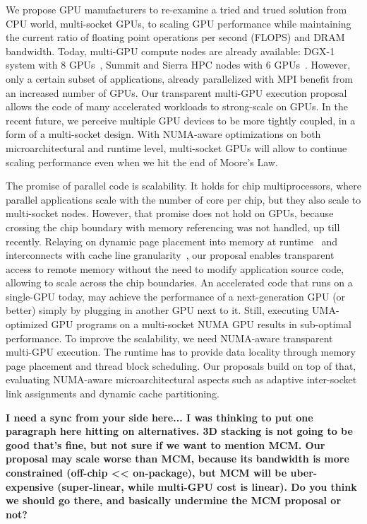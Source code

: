 \documentclass{sig-alternate}
\begin{document}
We propose GPU manufacturers to re-examine a tried and trued solution from CPU world, multi-socket GPUs, to scaling GPU performance while maintaining the current ratio of floating point operations per second (FLOPS) and DRAM bandwidth. Today, multi-GPU compute nodes are already available: DGX-1 system with 8 GPUs~\cite{dgx}, Summit and Sierra HPC nodes with 6 GPUs~\cite{summit_supercompute}. However, only a certain subset of applications, already parallelized with MPI benefit from an increased number of GPUs. Our transparent multi-GPU execution proposal allows the code of many accelerated workloads to strong-scale on GPUs. In the recent future, we perceive multiple GPU devices to be more tightly coupled, in a form of a multi-socket design. With NUMA-aware optimizations on both microarchitectural and runtime level, multi-socket GPUs will allow to continue scaling performance even when we hit the end of Moore's Law.

The promise of parallel code is scalability. It holds for chip multiprocessors, where parallel applications scale with the number of core per chip, but they also scale to multi-socket nodes. However, that promise does not hold on GPUs, because crossing the chip boundary with memory referencing was not handled, up till recently. Relaying on dynamic page placement into memory at runtime~\cite{UVM} and interconnects with cache line granularity~\cite{NVLINK}, our proposal enables transparent access to remote memory without the need to modify application source code, allowing to scale across the chip boundaries. An accelerated code that runs on a single-GPU today, may achieve the performance of a next-generation GPU (or better) simply by plugging in another GPU next to it. Still, executing UMA-optimized GPU programs on a multi-socket NUMA GPU results in sub-optimal performance. To improve the scalability, we need NUMA-aware transparent multi-GPU execution. The runtime has to provide data locality through memory page placement and thread block scheduling. Our proposals build on top of that, evaluating NUMA-aware microarchitectural aspects such as adaptive inter-socket link assignments and dynamic cache partitioning.

\textbf{I need a sync from your side here... I was thinking to put one paragraph here hitting on alternatives. 3D stacking is not going to be good that's fine, but not sure if we want to mention MCM. Our proposal may scale worse than MCM, because its bandwidth is more constrained (off-chip << on-package), but MCM will be uber-expensive (super-linear, while multi-GPU cost is linear). Do you think we should go there, and basically undermine the MCM proposal or not?}
\end{document}
